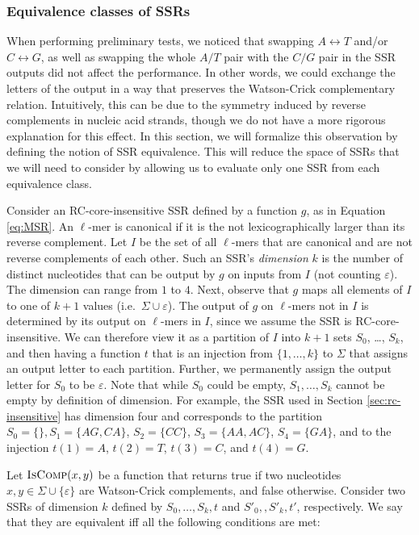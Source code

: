 \documentclass[
  11pt,
  twoside]{scrbook}
\begin{document}
\hypertarget{sec:equiv}{%
\subsubsection{Equivalence classes of SSRs}\label{sec:equiv}}

When performing preliminary tests, we noticed that swapping \(A\leftrightarrow T\)
and/or \(C\leftrightarrow G\), as well as swapping the whole \(A/T\) pair with the
\(C/G\) pair in the SSR outputs did not affect the performance. In other words, we
could exchange the letters of the output in a way that preserves the
Watson-Crick complementary relation. Intuitively, this can be due to the
symmetry induced by reverse complements in nucleic acid strands, though we do
not have a more rigorous explanation for this effect. In this section, we will
formalize this observation by defining the notion of SSR equivalence. This will
reduce the space of SSRs that we will need to consider by allowing us to
evaluate only one SSR from each equivalence class.

Consider an RC-core-insensitive SSR defined by a function \(g\), as in Equation
\eqref{eq:MSR}. An \(\ell\)-mer is canonical if it is the not lexicographically
larger than its reverse complement. Let \(I\) be the set of all \(\ell\)-mers that
are canonical and are not reverse complements of each other. Such an SSR's
\emph{dimension} \(k\) is the number of distinct nucleotides that can be output by \(g\)
on inputs from \(I\) (not counting \(\varepsilon\)). The dimension can range from
\(1\) to \(4\). Next, observe that \(g\) maps all elements of \(I\) to one of \(k+ 1\)
values (i.e.~\(\Sigma \cup \varepsilon\)). The output of \(g\) on \(\ell\)-mers not in
\(I\) is determined by its output on \(\ell\)-mers in \(I\), since we assume the SSR
is RC-core-insensitive. We can therefore view it as a partition of \(I\) into
\(k+1\) sets \(S_0\), \ldots, \(S_k\), and then having a function \(t\) that is an
injection from \(\{1, \ldots, k\}\) to \(\Sigma\) that assigns an output letter to
each partition. Further, we permanently assign the output letter for \(S_0\) to be
\(\varepsilon\). Note that while \(S_0\) could be empty, \(S_1, \ldots, S_k\) cannot
be empty by definition of dimension. For example, the SSR used in Section
\ref{sec:rc-insensitive} has dimension four and corresponds to the partition
\(S_0 = \{\},S_1=\{AG,CA\}\), \(S_2=\{CC\}\), \(S_3=\{AA,AC\}\), \(S_4=\{GA\}\), and to
the injection \(t(1) = A\), \(t(2) =T\), \(t(3) = C\), and \(t(4) = G\).

Let \(\textsc{IsComp}(x,y)\) be a function that returns true if two nucleotides
\(x, y \in \Sigma \cup \{\varepsilon\}\) are Watson-Crick complements, and false
otherwise. Consider two SSRs of dimension \(k\) defined by \(S_0, \ldots, S_k, t\)
and \(S'_0, , S'_k, t'\), respectively. We say that they are equivalent iff all
the following conditions are met:
\end{document}
